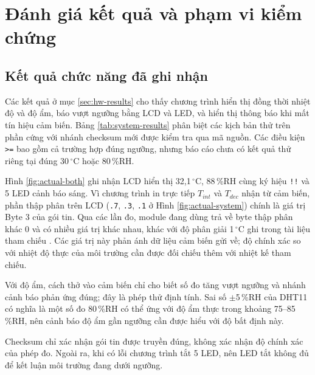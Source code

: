 \section{Đánh giá kết quả và phạm vi kiểm chứng}

\subsection{Kết quả chức năng đã ghi nhận}
\label{sec:eval-results}
Các kết quả ở mục \ref{sec:hw-results} cho thấy chương trình hiển thị đồng thời nhiệt độ và độ ẩm, báo vượt ngưỡng bằng LCD và LED, và hiển thị thông báo khi mất tín hiệu cảm biến. Bảng \ref{tab:system-results} phân biệt các kịch bản thử trên phần cứng với nhánh checksum mới được kiểm tra qua mã nguồn. Các điều kiện \texttt{>=} bao gồm cả trường hợp đúng ngưỡng, nhưng báo cáo chưa có kết quả thử riêng tại đúng 30\,$^\circ$C hoặc 80\,\%RH.

Hình \ref{fig:actual-both} ghi nhận LCD hiển thị 32,1\,$^\circ$C, 88\,\%RH cùng ký hiệu \texttt{!!} và 5 LED cảnh báo sáng. Vì chương trình in trực tiếp $T_{int}$ và $T_{dec}$ nhận từ cảm biến, phần thập phân trên LCD (\texttt{.7}, \texttt{.3}, \texttt{.1} ở Hình \ref{fig:actual-system}) chính là giá trị Byte 3 của gói tin. Qua các lần đo, module đang dùng trả về byte thập phân khác 0 và có nhiều giá trị khác nhau, khác với độ phân giải 1\,$^\circ$C ghi trong tài liệu tham chiếu \cite{dht11-datasheet}. Các giá trị này phản ánh dữ liệu cảm biến gửi về; độ chính xác so với nhiệt độ thực của môi trường cần được đối chiếu thêm với nhiệt kế tham chiếu.

Với độ ẩm, cách thở vào cảm biến chỉ cho biết số đo tăng vượt ngưỡng và nhánh cảnh báo phản ứng đúng; đây là phép thử định tính. Sai số $\pm$5\,\%RH của DHT11 có nghĩa là một số đo 80\,\%RH có thể ứng với độ ẩm thực trong khoảng 75--85\,\%RH, nên cảnh báo độ ẩm gần ngưỡng cần được hiểu với độ bất định này.

\begin{samepage}
Checksum chỉ xác nhận gói tin được truyền đúng, không xác nhận độ chính xác của phép đo. Ngoài ra, khi có lỗi chương trình tắt 5 LED, nên LED tắt không đủ để kết luận môi trường đang dưới ngưỡng.
\par\end{samepage}

